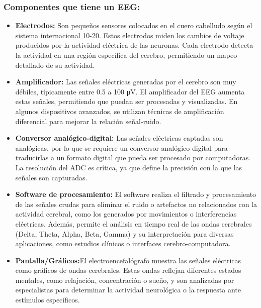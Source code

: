 \documentclass{article}
\begin{document}
\subsubsection{Componentes que tiene un EEG:}
\begin{itemize}
    \item \textbf{Electrodos:} Son pequeños sensores colocados en el cuero cabelludo según el sistema internacional 10-20. Estos electrodos miden los cambios de voltaje producidos por la actividad eléctrica de las neuronas. Cada electrodo detecta la actividad en una región específica del cerebro, permitiendo un mapeo detallado de su actividad.
    \item \textbf{Amplificador:} Las señales eléctricas generadas por el cerebro son muy débiles, típicamente entre 0.5 a 100 μV. El amplificador del EEG aumenta estas señales, permitiendo que puedan ser procesadas y visualizadas. En algunos dispositivos avanzados, se utilizan técnicas de amplificación diferencial para mejorar la relación señal-ruido.
    \item \textbf{Conversor analógico-digital:} Las señales eléctricas captadas son analógicas, por lo que se requiere un conversor analógico-digital para traducirlas a un formato digital que pueda ser procesado por computadoras. La resolución del ADC es crítica, ya que define la precisión con la que las señales son capturadas.
    \item \textbf{Software de procesamiento:} El software realiza el filtrado y procesamiento de las señales crudas para eliminar el ruido o artefactos no relacionados con la actividad cerebral, como los generados por movimientos o interferencias eléctricas. Además, permite el análisis en tiempo real de las ondas cerebrales (Delta, Theta, Alpha, Beta, Gamma) y su interpretación para diversas aplicaciones, como estudios clínicos o interfaces cerebro-computadora.
    \item \textbf{Pantalla/Gráficos:}El electroencefalógrafo muestra las señales eléctricas como gráficos de ondas cerebrales. Estas ondas reflejan diferentes estados mentales, como relajación, concentración o sueño, y son analizadas por especialistas para determinar la actividad neurológica o la respuesta ante estímulos específicos.
\end{itemize}
\end{document}
